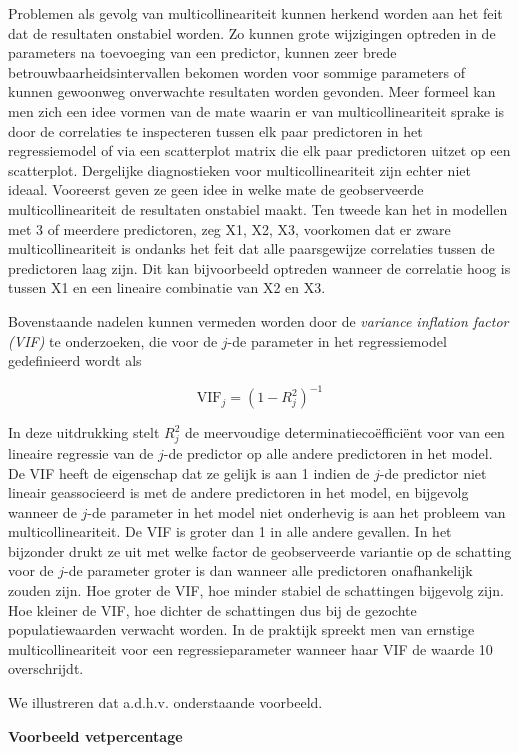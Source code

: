 \documentclass[
  dutch,
  letterpaper,
  12pt]{book}
\theoremstyle{definition}
\theoremstyle{definition}
\theoremstyle{definition}
\theoremstyle{remark}
\begin{document}
Problemen als gevolg van multicollineariteit kunnen herkend worden aan
het feit dat de resultaten onstabiel worden. Zo kunnen grote wijzigingen
optreden in de parameters na toevoeging van een predictor, kunnen zeer
brede betrouwbaarheidsintervallen bekomen worden voor sommige parameters
of kunnen gewoonweg onverwachte resultaten worden gevonden. Meer formeel
kan men zich een idee vormen van de mate waarin er van
multicollineariteit sprake is door de correlaties te inspecteren tussen
elk paar predictoren in het regressiemodel of via een scatterplot matrix
die elk paar predictoren uitzet op een scatterplot. Dergelijke
diagnostieken voor multicollineariteit zijn echter niet ideaal.
Vooreerst geven ze geen idee in welke mate de geobserveerde
multicollineariteit de resultaten onstabiel maakt. Ten tweede kan het in
modellen met 3 of meerdere predictoren, zeg X1, X2, X3, voorkomen dat er
zware multicollineariteit is ondanks het feit dat alle paarsgewijze
correlaties tussen de predictoren laag zijn. Dit kan bijvoorbeeld
optreden wanneer de correlatie hoog is tussen X1 en een lineaire
combinatie van X2 en X3.

Bovenstaande nadelen kunnen vermeden worden door de
\textit{variance inflation factor (VIF)} te onderzoeken, die voor de
\(j\)-de parameter in het regressiemodel gedefinieerd wordt als

\[
\textrm{VIF}_j=\left(1-R_j^2\right)^{-1}
\]

In deze uitdrukking stelt \(R_j^2\) de meervoudige
determinatiecoëfficiënt voor van een lineaire regressie van de \(j\)-de
predictor op alle andere predictoren in het model. De VIF heeft de
eigenschap dat ze gelijk is aan 1 indien de \(j\)-de predictor niet
lineair geassocieerd is met de andere predictoren in het model, en
bijgevolg wanneer de \(j\)-de parameter in het model niet onderhevig is
aan het probleem van multicollineariteit. De VIF is groter dan 1 in alle
andere gevallen. In het bijzonder drukt ze uit met welke factor de
geobserveerde variantie op de schatting voor de \(j\)-de parameter
groter is dan wanneer alle predictoren onafhankelijk zouden zijn. Hoe
groter de VIF, hoe minder stabiel de schattingen bijgevolg zijn. Hoe
kleiner de VIF, hoe dichter de schattingen dus bij de gezochte
populatiewaarden verwacht worden. In de praktijk spreekt men van
ernstige multicollineariteit voor een regressieparameter wanneer haar
VIF de waarde 10 overschrijdt.

We illustreren dat a.d.h.v. onderstaande voorbeeld.

\textbf{Voorbeeld vetpercentage}
\end{document}
